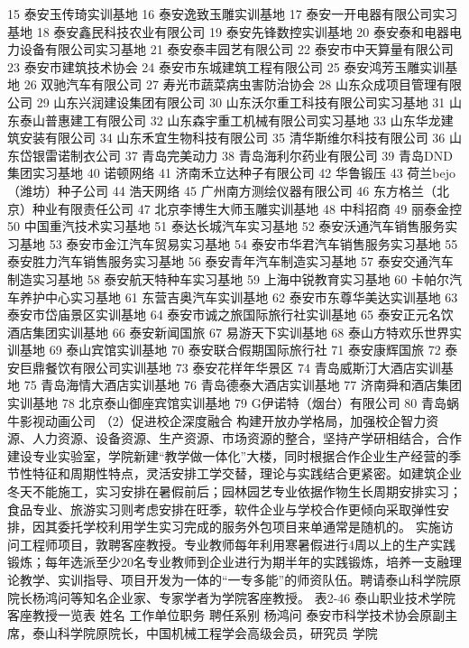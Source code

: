 15
泰安玉传琦实训基地
16
泰安逸致玉雕实训基地
17
泰安一开电器有限公司实习基地
18
泰安鑫民科技农业有限公司
19
泰安先锋数控实训基地
20
泰安泰和电器电力设备有限公司实习基地
21
泰安泰丰园艺有限公司
22
泰安市中天算量有限公司
23
泰安市建筑技术协会
24
泰安市东城建筑工程有限公司
25
泰安鸿芳玉雕实训基地
26
双驰汽车有限公司
27
寿光市蔬菜病虫害防治协会
28
山东众成项目管理有限公司
29
山东兴润建设集团有限公司
30
山东沃尔重工科技有限公司实习基地
31
山东泰山普惠建工有限公司
32
山东森宇重工机械有限公司实习基地
33
山东华龙建筑安装有限公司
34
山东禾宜生物科技有限公司
35
清华斯维尔科技有限公司
36
山东岱银雷诺制衣公司
37
青岛完美动力
38
青岛海利尔药业有限公司
39
青岛DND集团实习基地
40
诺顿网络
41
济南禾立达种子有限公司
42
华鲁锻压
43
荷兰bejo（潍坊）种子公司
44
浩天网络
45
广州南方测绘仪器有限公司
46
东方格兰（北京）种业有限责任公司
47
北京李博生大师玉雕实训基地
48
中科招商
49
丽泰金控
50
中国重汽技术实习基地
51
泰达长城汽车实习基地
52
泰安沃通汽车销售服务实习基地
53
泰安市金江汽车贸易实习基地
54
泰安市华君汽车销售服务实习基地
55
泰安胜力汽车销售服务实习基地
56
泰安青年汽车制造实习基地
57
泰安交通汽车制造实习基地
58
泰安航天特种车实习基地
59
上海中锐教育实习基地
60
卡帕尔汽车养护中心实习基地
61
东营吉奥汽车实训基地
62
泰安市东尊华美达实训基地
63
泰安市岱庙景区实训基地
64
泰安市诚之旅国际旅行社实训基地
65
泰安正元名饮酒店集团实训基地
66
泰安新闻国旅
67
易游天下实训基地
68
泰山方特欢乐世界实训基地
69
泰山宾馆实训基地
70
泰安联合假期国际旅行社
71
泰安康辉国旅
72
泰安巨鼎餐饮有限公司实训基地
73
泰安花样年华景区
74
青岛威斯汀大酒店实训基地
75
青岛海情大酒店实训基地
76
青岛德泰大酒店实训基地
77
济南舜和酒店集团实训基地
78
北京泰山御座宾馆实训基地
79
G伊诺特（烟台）有限公司
80
青岛蜗牛影视动画公司
（2）促进校企深度融合
构建开放办学格局，加强校企智力资源、人力资源、设备资源、生产资源、市场资源的整合，坚持产学研相结合，合作建设专业实验室，学院新建“教学做一体化”大楼，同时根据合作企业生产经营的季节性特征和周期性特点，灵活安排工学交替，理论与实践结合更紧密。如建筑企业冬天不能施工，实习安排在暑假前后；园林园艺专业依据作物生长周期安排实习；食品专业、旅游实习则考虑安排在旺季，软件企业与学校合作更倾向采取弹性安排，因其委托学校利用学生实习完成的服务外包项目来单通常是随机的。
实施访问工程师项目，敦聘客座教授。专业教师每年利用寒暑假进行4周以上的生产实践锻炼；每年选派至少20名专业教师到企业进行为期半年的实践锻炼，培养一支融理论教学、实训指导、项目开发为一体的“一专多能”的师资队伍。聘请泰山科学院原院长杨鸿问等知名企业家、专家学者为学院客座教授。
表2-46  泰山职业技术学院客座教授一览表
姓名
工作单位职务
聘任系别
杨鸿问
泰安市科学技术协会原副主席，泰山科学院原院长，中国机械工程学会高级会员，研究员
学院
